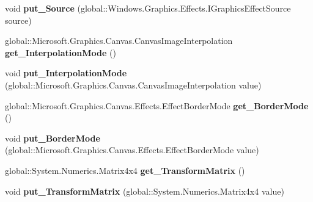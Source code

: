\begin{DoxyCompactItemize}
void {\bfseries put\+\_\+\+Source} (global\+::\+Windows.\+Graphics.\+Effects.\+I\+Graphics\+Effect\+Source source)
\item 
\mbox{\label{interface_microsoft_1_1_graphics_1_1_canvas_1_1_effects_1_1_i_transform3_d_effect_aefc252bdfd3579f343b3a345dba1a4f3}} 
global\+::\+Microsoft.\+Graphics.\+Canvas.\+Canvas\+Image\+Interpolation {\bfseries get\+\_\+\+Interpolation\+Mode} ()
\item 
\mbox{\label{interface_microsoft_1_1_graphics_1_1_canvas_1_1_effects_1_1_i_transform3_d_effect_a8ccce526ac8bfcfef799e807637ad92b}} 
void {\bfseries put\+\_\+\+Interpolation\+Mode} (global\+::\+Microsoft.\+Graphics.\+Canvas.\+Canvas\+Image\+Interpolation value)
\item 
\mbox{\label{interface_microsoft_1_1_graphics_1_1_canvas_1_1_effects_1_1_i_transform3_d_effect_a6e3886f8c1a115e3734fb2df7df7fc38}} 
global\+::\+Microsoft.\+Graphics.\+Canvas.\+Effects.\+Effect\+Border\+Mode {\bfseries get\+\_\+\+Border\+Mode} ()
\item 
\mbox{\label{interface_microsoft_1_1_graphics_1_1_canvas_1_1_effects_1_1_i_transform3_d_effect_a25a24175bd4b6592a9795eee3b7b7566}} 
void {\bfseries put\+\_\+\+Border\+Mode} (global\+::\+Microsoft.\+Graphics.\+Canvas.\+Effects.\+Effect\+Border\+Mode value)
\item 
\mbox{\label{interface_microsoft_1_1_graphics_1_1_canvas_1_1_effects_1_1_i_transform3_d_effect_a2bbd145f06ce7bf83aa605e71a35418b}} 
global\+::\+System.\+Numerics.\+Matrix4x4 {\bfseries get\+\_\+\+Transform\+Matrix} ()
\item 
\mbox{\label{interface_microsoft_1_1_graphics_1_1_canvas_1_1_effects_1_1_i_transform3_d_effect_a60689b755d5b8543e291b86faa19538b}} 
void {\bfseries put\+\_\+\+Transform\+Matrix} (global\+::\+System.\+Numerics.\+Matrix4x4 value)

\end{DoxyCompactItemize}
